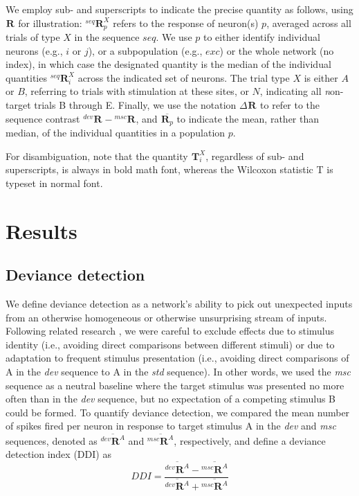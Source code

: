 \documentclass[9pt,lineno,onehalfspacing]{elife}
\newcommand{\dev}{\textit{dev}}
\newcommand{\msc}{\textit{msc}}
\newcommand{\std}{\textit{std}}
\newcommand{\R}[3][]{{}^{#1}_{}\boldsymbol R^{#2}_{#3}}
\newcommand{\T}[3][]{{}^{#1}_{}\boldsymbol T^{#2}_{#3}}
\newcommand{\mean}[1]{\overline{#1}}
\begin{document}
We employ sub- and superscripts to indicate the precise quantity as follows, using $\R{}{}$ for illustration: $\R[seq]{X}{p}$ refers to the response of neuron(s) $p$, averaged across all trials of type $X$ in the sequence $seq$. We use $p$ to either identify individual neurons (e.g., $i$ or $j$), or a subpopulation (e.g., $exc$) or the whole network (no index), in which case the designated quantity is the median of the individual quantities $\R[seq]{X}{i}$ across the indicated set of neurons. The trial type $X$ is either $A$ or $B$, referring to trials with stimulation at these sites, or $N$, indicating all \textit{n}on-target trials B through E. Finally, we use the notation $\Delta \R{}{}$ to refer to the sequence contrast $\R[dev]{}{} - \R[msc]{}{}$, and $\mean{\R{}{p}}$ to indicate the mean, rather than median, of the individual quantities in a population $p$.

For disambiguation, note that the quantity $\T{X}{i}$, regardless of sub- and superscripts, is always in bold math font, whereas the Wilcoxon statistic T is typeset in normal font.

\section{Results}\label{sec:results}

\subsection{Deviance detection}\label{sec:dd}

We define deviance detection as a network's ability to pick out unexpected inputs from an otherwise homogeneous or otherwise unsurprising stream of inputs. Following related research \citep{Kubota2021-dx,Harms2014-ah,Jacobsen2001-sc}, we were careful to exclude effects due to stimulus identity (i.e., avoiding direct comparisons between different stimuli) or due to adaptation to frequent stimulus presentation (i.e., avoiding direct comparisons of A in the \dev{} sequence to A in the \std{} sequence). In other words, we used the \msc{} sequence as a neutral baseline where the target stimulus was presented no more often than in the \dev{} sequence, but no expectation of a competing stimulus B could be formed. To quantify deviance detection, we compared the mean number of spikes fired per neuron in response to target stimulus A in the \dev{} and \msc{} sequences, denoted as $\mean{\R[dev]{A}{}}$ and $\mean{\R[msc]{A}{}}$, respectively, and define a deviance detection index (DDI) as
\begin{equation}
    DDI = \frac{\mean{\R[dev]{A}{}} - \mean{\R[msc]{A}{}}}{\mean{\R[dev]{A}{}} + \mean{\R[msc]{A}{}}} \label{eq:ddi}
\end{equation}
\end{document}
